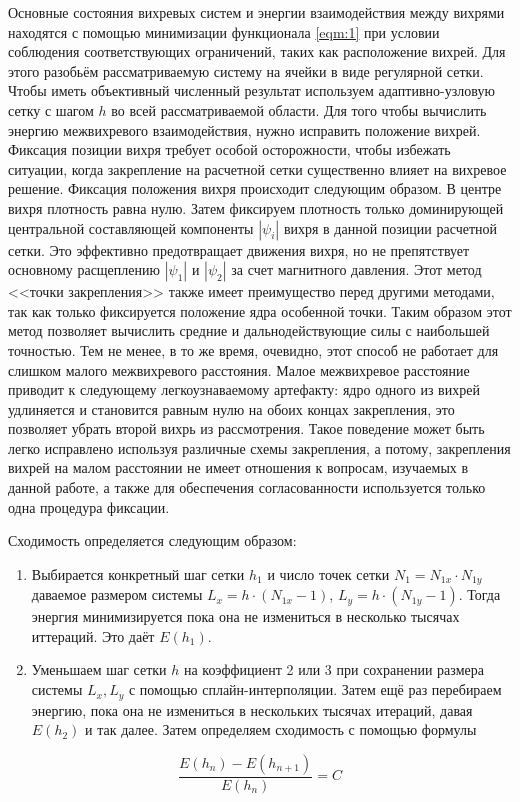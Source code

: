 Основные состояния вихревых систем и энергии взаимодействия между вихрями 
находятся с помощью минимизации функционала \eqref{eqm:1} при условии 
соблюдения соответствующих ограничений, таких как расположение вихрей. Для 
этого разобьём рассматриваемую систему на ячейки в виде регулярной сетки. 
Чтобы иметь объективный численный результат используем адаптивно-узловую сетку 
с шагом \( h \) во всей рассматриваемой области. Для того чтобы вычислить 
энергию межвихревого взаимодействия, нужно исправить положение вихрей. 
Фиксация позиции вихря требует особой осторожности, чтобы избежать ситуации, 
когда закрепление на расчетной сетки существенно влияет на вихревое решение. 
Фиксация положения вихря происходит следующим образом. В центре вихря 
плотность равна нулю. Затем фиксируем плотность только доминирующей 
центральной составляющей компоненты \( |\psi_i| \) вихря в данной позиции 
расчетной сетки. Это эффективно предотвращает движения вихря, но не 
препятствует основному расщеплению \( |\psi_1| \) и \( |\psi_2| \) за счет 
магнитного давления. Этот метод <<точки закрепления>> также имеет преимущество 
перед другими методами, так как только фиксируется положение ядра особенной 
точки. Таким образом этот метод позволяет вычислить средние и 
дальнодействующие силы с наибольшей точностью. Тем не менее, в то же время, 
очевидно, этот способ не работает для слишком малого межвихревого расстояния. 
Малое межвихревое расстояние приводит к следующему легкоузнаваемому артефакту: 
ядро одного из вихрей удлиняется и становится равным нулю на обоих концах 
закрепления, это позволяет убрать второй вихрь из рассмотрения. Такое 
поведение может быть легко исправлено используя различные схемы закрепления, а 
потому, закрепления вихрей на малом расстоянии не имеет отношения к вопросам, 
изучаемых в данной работе, а также для обеспечения согласованности 
используется только одна процедура фиксации.

Сходимость определяется следующим образом:
\begin{enumerate}
    \item Выбирается конкретный шаг сетки \( h_1 \) и число точек сетки 
        \( N_1 = N_{1x} \cdot N_{1y} \) даваемое размером системы
        \( L_x = h \cdot (N_{1x}-1) \), \( L_y = h \cdot (N_{1y}-1) \). 
        Тогда энергия минимизируется пока она не измениться в несколько
        тысячах иттераций. Это даёт \( E(h_1) \).
    \item Уменьшаем шаг сетки \( h \) на коэффициент 2 или 3 при сохранении 
        размера системы \( L_x, L_y \) с помощью сплайн-интерполяции. 
        Затем ещё раз перебираем энергию, пока она не измениться в 
        нескольких тысячах итераций, давая \( E(h_2) \) и так далее. 
        Затем определяем сходимость с помощью формулы
\end{enumerate}
\begin{equation}
    \frac{E(h_n) - E(h_{n+1})}{E(h_n)} = C
\end{equation}

